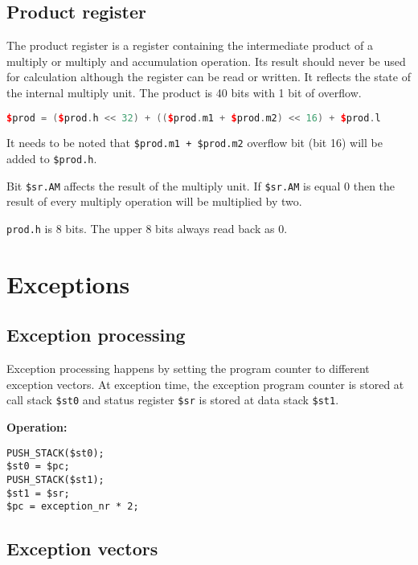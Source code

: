 \documentclass[oneside,english,a4paper,10pt,oneside,openany,final]{memoir}
\newcommand{\InlineExpression}[1]{\texttt{#1}}
\newcommand{\Register}[1]{\texttt{#1}}
\newcommand{\RegisterField}[1]{\texttt{#1}}
\begin{document}
\pagebreak{}

\section{Product register}

The product register is a register containing the intermediate product of a multiply or multiply and accumulation operation.
Its result should never be used for calculation although the register can be read or written.
It reflects the state of the internal multiply unit. The product is 40 bits with 1 bit of overflow.

\begin{lstlisting}[language=C++]
$prod = ($prod.h << 32) + (($prod.m1 + $prod.m2) << 16) + $prod.l
\end{lstlisting}

It needs to be noted that \InlineExpression{\$prod.m1 + \$prod.m2} overflow bit (bit 16) will be added to \Register{\$prod.h}.

Bit \RegisterField{\$sr.AM} affects the result of the multiply unit.
If \RegisterField{\$sr.AM} is equal 0 then the result of every multiply operation will be multiplied by two.

\Register{prod.h} is 8 bits.  The upper 8 bits always read back as 0.

\pagebreak{}

\chapter{Exceptions}

\section{Exception processing}

Exception processing happens by setting the program counter to different exception vectors.
At exception time, the exception program counter is stored at call stack \Register{\$st0} and status register \Register{\$sr} is stored at data stack \Register{\$st1}.

\textbf{Operation:}
\begin{lstlisting}[basicstyle=\ttfamily]
PUSH_STACK($st0);
$st0 = $pc;
PUSH_STACK($st1);
$st1 = $sr;
$pc = exception_nr * 2;
\end{lstlisting}

\pagebreak{}

\section{Exception vectors}
\end{document}
